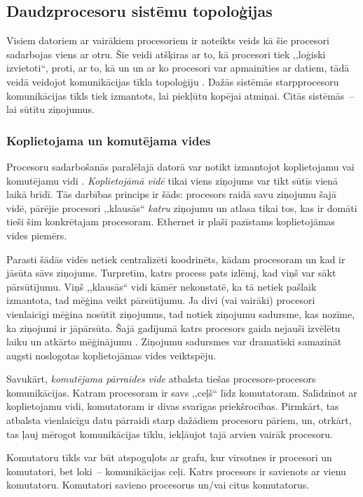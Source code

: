 \subsection{Daudzprocesoru sistēmu topoloģijas}
Visiem datoriem ar vairākiem procesoriem ir noteikts veids kā šie procesori sadarbojas viens
ar otru. Šie veidi atšķiras ar to, kā procesori tiek ,,loģiski izvietoti``, proti, ar to,
kā un un ar ko procesori var apmainīties ar datiem, tādā veidā veidojot komunikācijas tīkla
topoloģiju \cite{ParProgInC}. Dažās sistēmās starpprocesoru komunikācijas tīkls tiek izmantots, lai piekļūtu
kopējai atmiņai. Citās sistēmās~-- lai sūtītu ziņojumus.

\subsubsection{Koplietojama un komutējama vides}
Procesoru sadarbošanās paralēlajā datorā var notikt izmantojot koplietojamu vai komutējamu
vidi  \cite{ParProgInC}. \emph{Koplietojāmā vidē} tikai viens
ziņojums var tikt sūtīs vienā laikā brīdī. Tās darbības princips ir šāds: procesors raidā
savu ziņojumu šajā vidē, pārējie procesori ,,klausās`` \emph{katru} ziņojumu un atlasa tikai
tos, kas ir domāti tieši šim konkrētajam procesoram. Ethernet ir plaši pazīstams koplietojāmas
vides piemērs.

Parasti šādās vidēs netiek centralizēti koodrinēts, kādam procesoram un kad ir jāsūta sāvs
ziņojums. Turpretīm, katrs process pats izlēmj, kad viņš var sākt pārsūtījumu. Viņš ,,klausās``
vidi kāmēr nekonstatē, ka tā netiek pašlaik izmantota, tad mēģina veikt pārsūtījumu. Ja
divi (vai vairāki) procesori vienlaicīgi mēģina nosūtīt ziņojumus, tad notiek ziņojumu sadursme,
kas nozīme, ka ziņojumi ir jāpārsūta. Šajā gadījumā katrs procesors gaida nejauši izvēlētu
laiku un atkārto mēģinājumu \cite{ParProgInC}. Ziņojumu sadursmes var dramatīski samazināt
augsti noslogotas koplietojāmas vides veiktspēju.

Savukārt, \emph{komutējama pārraides vide} atbalsta tiešas procesors-procesors komunikācijas.
Katram procesoram ir savs ,,ceļš`` līdz komutatoram. Salīdzinot ar koplietojamu vidi, komutatoram
ir divas svarīgas priekšrocības. Pirmkārt, tas atbalsta vienlaicīgu datu pārraidi starp dažādiem
procesoru pāriem, un, otrkārt, tas ļauj mērogot komunikācijas tīklu, iekļāujot tajā arvien
vairāk procesoru.

Komutatoru tīkls var būt atspoguļots ar grafu, kur virsotnes ir procesori un komutatori,
bet loki~-- komunikācijas ceļi. Katrs procesors ir savienots ar vienu komutatoru. Komutatori
savieno procesorus un/vai citus komutatorus.

